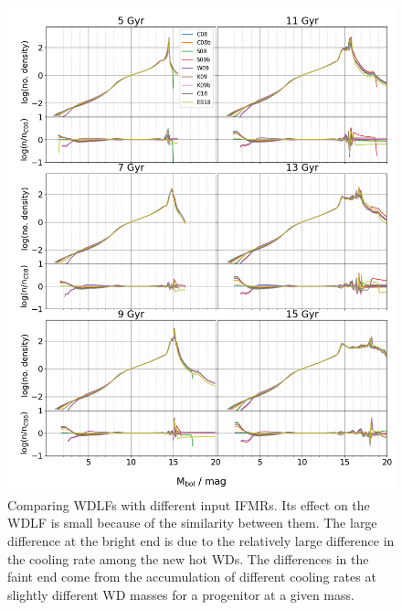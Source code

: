 \documentclass[fleqn,usenatbib]{rasti}
\begin{document}
\begin{figure}
    \centering
    \includegraphics[width=\textwidth]{fig_10_wdlf_compare_ifmr.png}
    \caption{Comparing WDLFs with different input IFMRs. Its effect on the WDLF
    is small because of the similarity between them. The large difference at
    the bright end is due to the relatively large difference in the cooling
    rate among the new hot WDs. The differences in the faint end come from the
    accumulation of different cooling rates at slightly different WD masses for
    a progenitor at a given mass.}
    \label{fig:wdlf_compare_ifmr}
\end{figure}
\end{document}
